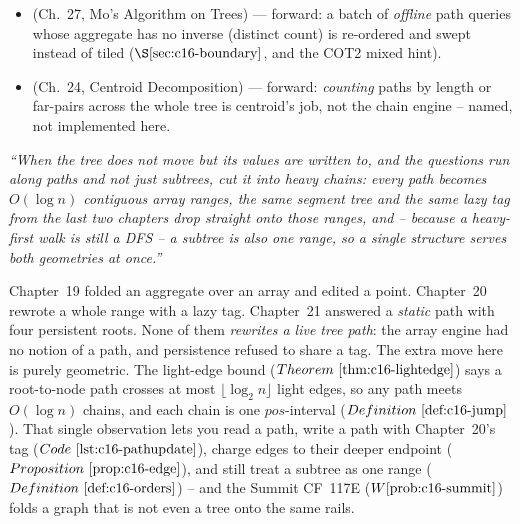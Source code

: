 \begin{itemize}[nosep, leftmargin=1.4em]
        composable monoid op (\(\min\)-assign, modulo, a line maximum) leaves this chapter for
        beats / Li Chao. \textbf{This is the Next chapter.}
  \item {} (Ch.~27, Mo's Algorithm on Trees) --- forward: a batch of \emph{offline} path
        queries whose aggregate has no inverse (distinct count) is re-ordered and swept instead of
        tiled (\(\secref{c16-boundary}\), and the COT2 mixed hint).
  \item {} (Ch.~24, Centroid Decomposition) --- forward: \emph{counting} paths by length or
        far-pairs across the whole tree is centroid's job, not the chain engine -- named, not
        implemented here.
\end{itemize}

\begin{lastword}
\emph{``When the tree does not move but its values are written to, and the questions run along
paths and not just subtrees, cut it into heavy chains: every path becomes \(O(\log n)\) contiguous
array ranges, the same segment tree and the same lazy tag from the last two chapters drop straight
onto those ranges, and -- because a heavy-first walk is still a DFS -- a subtree is \emph{also} one
range, so a single structure serves both geometries at once.''}

\medskip
Chapter~19 folded an aggregate over an array and edited a point. Chapter~20 rewrote a whole range
with a lazy tag. Chapter~21 answered a \emph{static} path with four persistent roots. None of them
\emph{rewrites a live tree path}: the array engine had no notion of a path, and persistence refused
to share a tag. The extra move here is purely geometric. The light-edge bound
(\(\thmref{c16-lightedge}\)) says a root-to-node path crosses at most \(\lfloor\log_2 n\rfloor\)
light edges, so any path meets \(O(\log n)\) chains, and each chain is one \(\mathit{pos}\)-interval
(\(\defref{c16-jump}\)). That single observation lets you read a path, write a path with Chapter~20's
tag (\(\coderef{c16-pathupdate}\)), charge edges to their deeper endpoint (\(\propref{c16-edge}\)),
and still treat a subtree as one range (\(\defref{c16-orders}\)) -- and the Summit CF~117E
(\(\probref{c16-summit}\)) folds a graph that is not even a tree onto the same rails.


\end{lastword}
